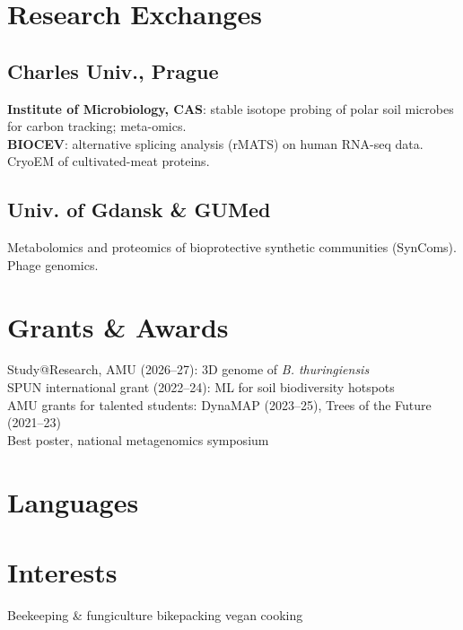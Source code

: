\documentclass[]{deedy-resume-openfont}
\begin{document}
\begin{minipage}[t]{0.33\textwidth}

\section{Research Exchanges}

\subsection{Charles Univ., Prague}
\location{\WhenCharles{}}
{\footnotesize \textbullet{} \textbf{Institute of Microbiology, CAS}: stable isotope probing of polar soil microbes for carbon tracking; meta-omics. \\
\textbullet{} \textbf{BIOCEV}: alternative splicing analysis (rMATS) on human RNA-seq data. \\
\textbullet{} CryoEM of cultivated-meat proteins.}\\
\sectionsep

\subsection{Univ. of Gdansk \& GUMed}
\location{\WhenGdansk{}}
{\footnotesize \textbullet{} Metabolomics and proteomics of bioprotective synthetic communities (SynComs). \\
\textbullet{} Phage genomics.}\\
\sectionsep

\section{Grants \& Awards}
{\footnotesize
\textbullet{} Study@Research, AMU (2026--27): 3D genome of \textit{B. thuringiensis} \\
\textbullet{} SPUN international grant (2022--24): ML for soil biodiversity hotspots \\
\textbullet{} AMU grants for talented students: DynaMAP (2023--25), Trees of the Future (2021--23) \\
\textbullet{} Best poster, national metagenomics symposium}
\sectionsep

\section{Languages}
\LanguagesStacked{}
\sectionsep

\section{Interests}
{\footnotesize Beekeeping \& fungiculture \textbullet{} bikepacking \textbullet{} vegan cooking}

\end{minipage}
\end{document}
